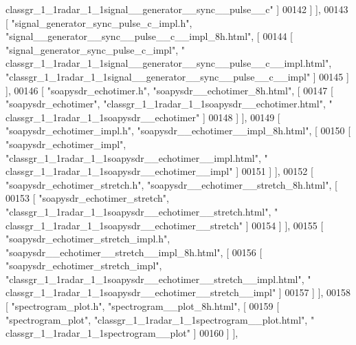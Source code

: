 \begin{DoxyCode}
{      classgr\_1\_1radar\_1\_1signal\_\_generator\_\_sync\_\_pulse\_\_c"} ]
00142     ] ],
00143     [ \textcolor{stringliteral}{"signal\_generator\_sync\_pulse\_c\_impl.h"}, \textcolor{stringliteral}{"signal\_\_generator\_\_sync\_\_pulse\_\_c\_\_impl\_8h.html"}, [
00144       [ \textcolor{stringliteral}{"signal\_generator\_sync\_pulse\_c\_impl"}, \textcolor{stringliteral}{"
      classgr\_1\_1radar\_1\_1signal\_\_generator\_\_sync\_\_pulse\_\_c\_\_impl.html"}, \textcolor{stringliteral}{"classgr\_1\_1radar\_1\_1signal\_\_generator\_\_sync\_\_pulse\_\_c\_\_impl"} ]
00145     ] ],
00146     [ \textcolor{stringliteral}{"soapysdr\_echotimer.h"}, \textcolor{stringliteral}{"soapysdr\_\_echotimer\_8h.html"}, [
00147       [ \textcolor{stringliteral}{"soapysdr\_echotimer"}, \textcolor{stringliteral}{"classgr\_1\_1radar\_1\_1soapysdr\_\_echotimer.html"}, \textcolor{stringliteral}{"
      classgr\_1\_1radar\_1\_1soapysdr\_\_echotimer"} ]
00148     ] ],
00149     [ \textcolor{stringliteral}{"soapysdr\_echotimer\_impl.h"}, \textcolor{stringliteral}{"soapysdr\_\_echotimer\_\_impl\_8h.html"}, [
00150       [ \textcolor{stringliteral}{"soapysdr\_echotimer\_impl"}, \textcolor{stringliteral}{"classgr\_1\_1radar\_1\_1soapysdr\_\_echotimer\_\_impl.html"}, \textcolor{stringliteral}{"
      classgr\_1\_1radar\_1\_1soapysdr\_\_echotimer\_\_impl"} ]
00151     ] ],
00152     [ \textcolor{stringliteral}{"soapysdr\_echotimer\_stretch.h"}, \textcolor{stringliteral}{"soapysdr\_\_echotimer\_\_stretch\_8h.html"}, [
00153       [ \textcolor{stringliteral}{"soapysdr\_echotimer\_stretch"}, \textcolor{stringliteral}{"classgr\_1\_1radar\_1\_1soapysdr\_\_echotimer\_\_stretch.html"}, \textcolor{stringliteral}{"
      classgr\_1\_1radar\_1\_1soapysdr\_\_echotimer\_\_stretch"} ]
00154     ] ],
00155     [ \textcolor{stringliteral}{"soapysdr\_echotimer\_stretch\_impl.h"}, \textcolor{stringliteral}{"soapysdr\_\_echotimer\_\_stretch\_\_impl\_8h.html"}, [
00156       [ \textcolor{stringliteral}{"soapysdr\_echotimer\_stretch\_impl"}, \textcolor{stringliteral}{"classgr\_1\_1radar\_1\_1soapysdr\_\_echotimer\_\_stretch\_\_impl.html"}, \textcolor{stringliteral}{"
      classgr\_1\_1radar\_1\_1soapysdr\_\_echotimer\_\_stretch\_\_impl"} ]
00157     ] ],
00158     [ \textcolor{stringliteral}{"spectrogram\_plot.h"}, \textcolor{stringliteral}{"spectrogram\_\_plot\_8h.html"}, [
00159       [ \textcolor{stringliteral}{"spectrogram\_plot"}, \textcolor{stringliteral}{"classgr\_1\_1radar\_1\_1spectrogram\_\_plot.html"}, \textcolor{stringliteral}{"
      classgr\_1\_1radar\_1\_1spectrogram\_\_plot"} ]
00160     ] ],

\end{DoxyCode}
